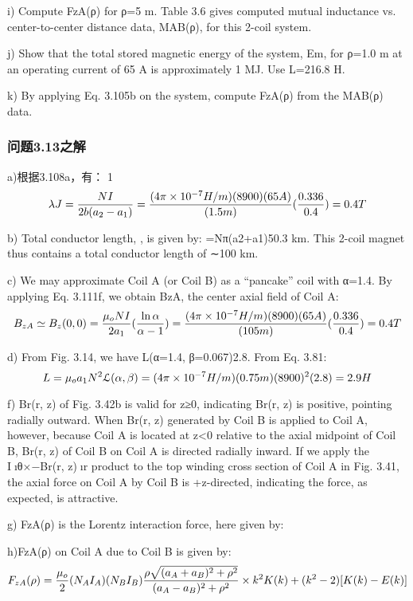 i) Compute FzA(ρ) for ρ=5 m.
Table 3.6 gives computed mutual inductance vs. center-to-center distance data,
MAB(ρ), for this 2-coil system.

j) Show that the total stored magnetic energy of the system, Em, for ρ=1.0 m
at an operating current of 65 A is approximately 1 MJ. Use L=216.8 H.

k) By applying Eq. 3.105b on the system, compute FzA(ρ) from the MAB(ρ) data.


\subsubsection{问题3.13之解}
a)根据3.108a，有：
1$$
\lambda J=\frac{NI}{2b(a_{2}-a_{1})}\\%
=\frac{(4\pi\times10^{-7}H/m)(8900)(65A)}{(1.5m)}(\frac{0.336}{0.4})=0.4T\\
$$

b) Total conductor length, , is given by: =Nπ(a2+a1)50.3 km. This 2-coil
magnet thus contains a total conductor length of ∼100 km.

c) We may approximate Coil A (or Coil B) as a “pancake” coil with α=1.4. By
applying Eq. 3.111f, we obtain BzA, the center axial field of Coil A:
$$
B_{zA}\simeq B_{z}(0,0)=\frac{\mu_{o}NI}{2a_{1}}(\frac{\ln\alpha}{\alpha-1})\\%
=\frac{(4\pi\times10^{-7}H/m)(8900)(65A)}{(105m)}(\frac{0.336}{0.4})=0.4T\\
$$

d) From Fig. 3.14, we have L(α=1.4, β=0.067)2.8. From Eq. 3.81:
$$
L=\mu_{o}a_{1}N^{2}\mathcal{L}(\alpha,\beta)\\%
=(4\pi\times10^{-7}H/m)(0.75m)(8900)^{2}(2.8)=2.9H\\
$$

f) Br(r, z) of Fig. 3.42b is valid for z≥0, indicating Br(r, z) is positive, pointing
radially outward. When Br(r, z) generated by Coil B is applied to Coil A, however,
because Coil A is located at z<0 relative to the axial midpoint of Coil B, Br(r, z)
of Coil B on Coil A is directed radially inward. If we apply the Iıθ×−Br(r, z)ır
product to the top winding cross section of Coil A in Fig. 3.41, the axial force on
Coil A by Coil B is +z-directed, indicating the force, as expected, is attractive.

g) FzA(ρ) is the Lorentz interaction force, here given by:

h)FzA(ρ) on Coil A due to Coil B is given by:
$$
F_{zA}(\rho)=\frac{\mu_{o}}{2}(N_{A}I_{A})(N_{B}I_{B})\frac{\rho\sqrt{(a_{A}+a_{B})^{2}+\rho^{2}}}{(a_{A}-a_{B})^{2}+\rho^{2}}\\
\times{k^{2}K(k)+(k^{2}-2)[K(k)-E(k)]}\\%
$$

